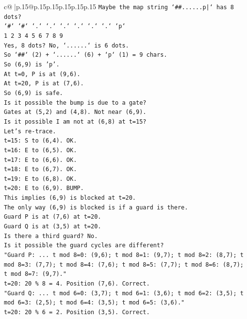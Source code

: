 \documentclass{article}
\begin{document}
{\begin{supertabular}{c@{$\;$}|p{.15\linewidth}@{}p{.15\linewidth}p{.15\linewidth}p{.15\linewidth}p{.15\linewidth}p{.15\linewidth}}
{{{\texttt{Maybe the map string `\#\#......p|` has 8 dots?} \\
\texttt{`\#` `\#` `.` `.` `.` `.` `.` `.` `p`} \\
\texttt{1 2 3 4 5 6 7 8 9} \\
\texttt{Yes, 8 dots? No, `......` is 6 dots.} \\
\texttt{So `\#\#` (2) + `......` (6) + `p` (1) = 9 chars.} \\
\texttt{So (6,9) is 'p'.} \\
\texttt{At t=0, P is at (9,6).} \\
\texttt{At t=20, P is at (7,6).} \\
\texttt{So (6,9) is safe.} \\
\texttt{Is it possible the bump is due to a gate?} \\
\texttt{Gates at (5,2) and (4,8). Not near (6,9).} \\
\texttt{Is it possible I am not at (6,8) at t=15?} \\
\texttt{Let's re{-}trace.} \\
\texttt{t=15: S to (6,4). OK.} \\
\texttt{t=16: E to (6,5). OK.} \\
\texttt{t=17: E to (6,6). OK.} \\
\texttt{t=18: E to (6,7). OK.} \\
\texttt{t=19: E to (6,8). OK.} \\
\texttt{t=20: E to (6,9). BUMP.} \\
\texttt{This implies (6,9) is blocked at t=20.} \\
\texttt{The only way (6,9) is blocked is if a guard is there.} \\
\texttt{Guard P is at (7,6) at t=20.} \\
\texttt{Guard Q is at (3,5) at t=20.} \\
\texttt{Is there a third guard? No.} \\
\texttt{Is it possible the guard cycles are different?} \\
\texttt{"Guard P: ... t mod 8=0: (9,6); t mod 8=1: (9,7); t mod 8=2: (8,7); t mod 8=3: (7,7); t mod 8=4: (7,6); t mod 8=5: (7,7); t mod 8=6: (8,7); t mod 8=7: (9,7)."} \\
\texttt{t=20: 20 \% 8 = 4. Position (7,6). Correct.} \\
\texttt{"Guard Q: ... t mod 6=0: (3,7); t mod 6=1: (3,6); t mod 6=2: (3,5); t mod 6=3: (2,5); t mod 6=4: (3,5); t mod 6=5: (3,6)."} \\
\texttt{t=20: 20 \% 6 = 2. Position (3,5). Correct.} \\
}}}
\end{supertabular}}
\end{document}
